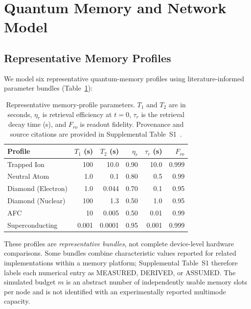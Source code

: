 \documentclass[quantumrep,article,submit,moreauthors]{Definitions/mdpi}
\begin{document}
\section{Quantum Memory and Network Model}
\label{sec:model}

\subsection{Representative Memory Profiles}

We model six representative quantum-memory profiles using literature-informed parameter bundles (Table~\ref{tab:memory}):

\begin{table}[htbp]
\centering
\caption{Representative memory-profile parameters. $T_1$ and $T_2$ are in seconds, $\eta_r$ is retrieval efficiency at $t=0$, $\tau_r$ is the retrieval decay time (s), and $F_{ro}$ is readout fidelity. Provenance and source citations are provided in Supplemental Table~S1~\cite{langer2005long,wang2014high,wang2024fine,hosseini2006gem,wang2018eit,balasubramanian2009ultralong,steiner2010universal,bradley2022robust,maurer2012room,rielandner2021storage,laplane2017multimode,reagor2016quantum}.}
\label{tab:memory}
\begin{tabular}{lrrrrr}
\toprule
Profile & $T_1$ (s) & $T_2$ (s) & $\eta_r$ & $\tau_r$ (s) & $F_{ro}$ \\
\midrule
Trapped Ion & 100 & 10.0 & 0.90 & 10.0 & 0.999 \\
Neutral Atom & 1.0 & 0.1 & 0.80 & 0.5 & 0.99 \\
Diamond (Electron) & 1.0 & 0.044 & 0.70 & 0.1 & 0.95 \\
Diamond (Nuclear) & 100 & 1.3 & 0.50 & 1.0 & 0.95 \\
AFC & 10 & 0.005 & 0.50 & 0.01 & 0.99 \\
Superconducting & 0.001 & 0.0001 & 0.95 & 0.001 & 0.999 \\
\bottomrule
\end{tabular}
\end{table}

These profiles are \textit{representative bundles}, not complete device-level hardware comparisons. Some bundles combine characteristic values reported for related implementations within a memory platform; Supplemental Table~S1 therefore labels each numerical entry as MEASURED, DERIVED, or ASSUMED. The simulated budget $m$ is an abstract number of independently usable memory slots per node and is not identified with an experimentally reported multimode capacity.
\end{document}

